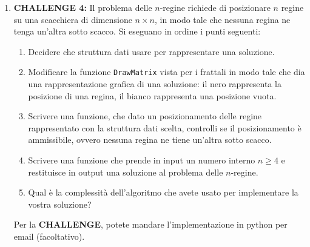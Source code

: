 \documentclass[11pt,a4]{article}
\begin{document}
\begin{enumerate}
\item {\bf CHALLENGE 4:} Il problema delle $n$-regine richiede di posizionare $n$ regine su una scacchiera
di dimensione $n \times n$, in modo tale che nessuna regina ne tenga un'altra sotto scacco. Si eseguano in ordine 
i punti seguenti:
\begin{enumerate}
\item Decidere che struttura dati usare per rappresentare una soluzione.
\item Modificare la funzione {\tt DrawMatrix} vista per i frattali in modo tale che dia una rappresentazione grafica di una soluzione: il nero rappresenta la posizione di una regina, il bianco rappresenta una posizione vuota.
\item Scrivere una funzione, che dato un posizionamento delle regine rappresentato con la struttura dati scelta,
controlli se il posizionamento è ammissibile, ovvero nessuna regina ne tiene un'altra sotto scacco.
\item Scrivere una funzione che prende in input un numero interno $n \geq 4$ e restituisce in output una soluzione al problema
delle $n$-regine.
\item Qual è la complessità dell'algoritmo che avete usato per implementare la vostra soluzione?
\end{enumerate}

Per la {\bf CHALLENGE}, potete mandare l'implementazione in python per email (facoltativo).
\end{enumerate}
\end{document}

